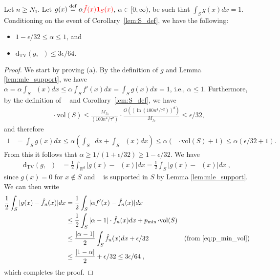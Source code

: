 \documentclass[final,12pt]{colt2018}
\newcommand{\nnew}[1]{{\color{red} #1}}
\newcommand{\nnew}[1]{#1}
\newcommand{\new}[1]{{\color{red} #1}}
\newcommand{\new}[1]{{#1}}
\newtheorem{informal theorem}[theorem]{Theorem (informal statement)}
\newcommand{\eqdef}{\stackrel{{\mathrm {\footnotesize def}}}{=}}
\newcommand{\eps}{\epsilon}
\newcommand{\TV}{\mathrm{d_{TV}}}
\newcommand{\mle}{\mathop{\hat{f}_n}}
\newcommand{\pmin}{\mathop{p_{\mathrm{min}}}}
\newcommand{\vol}{\mathrm{vol}}
\begin{document}
\begin{lemma}\label{lem:tv}
Let $n \geq N_1$.
Let $g(x) \eqdef \alpha \nnew{\tilde{f}(x) \mathbf{1}_S(x)}$, $\alpha \in [0,\infty)$, be such that $\int_{S} g(x) dx = 1$.
Conditioning on the event of Corollary~\ref{lem:S_def}, we have the following:
\begin{itemize}
\item[(a)] $1-\eps/32 \leq \alpha \leq 1$, and 
\item[(b)] $\TV(g, \mle) \leq {3\eps/64}$.
\end{itemize}
\end{lemma}
\begin{proof}
We start by proving (a).
By the definition of $g$ and Lemma \ref{lem:mle_support}, we have $\alpha = \alpha \int_{S} \mle(x) dx \leq \alpha \int_S f'(x) dx = \int_S g(x) dx = 1$, i.e., 
$\alpha \leq 1$.
Furthermore, \new{by the definition of $\pmin$ and Corollary~\ref{lem:S_def},} we have
\begin{align}
\pmin \cdot \vol(S) 
\leq \frac{M_{f_0}}{(100 n^4/\tau^2)} \cdot \frac{O((\ln(100 n^4/\tau^2))^d)}{M_{f_0}}
\leq {\eps/32}, \label{eq:p_min_vol}
\end{align}
and therefore
\begin{align*}
1 &= \int_S {g(x)} dx 
\leq \alpha \left( \int_S \pmin dx + \int_S \mle(x) dx \right) 
\leq \alpha ( \pmin \cdot \vol(S) + 1) 
\leq  {\alpha(\eps/32 + 1)}.
\end{align*}
From this it follows that
 {$\alpha \geq 1/(1+\eps/32) \geq 1 - \eps/32$}.
We have
\begin{align}
\TV(g, \mle) &= \frac{1}{2} \int_{\mathbb{R}^d} |g(x) - \mle(x)| dx = \frac{1}{2} \int_{S} |g(x) - \mle(x)| dx \;, \label{eq:tv1}
\end{align}
since \nnew{$g(x) = 0$ for $x \notin S$} and $\mle$ is supported in $S$ by Lemma \ref{lem:mle_support}.
We can then write
\begin{align*}
\frac{1}{2} \int_{S} |g(x) - \mle(x)| dx 
&= \frac{1}{2} \int_{S} |\alpha f'(x) - \mle(x)| dx \\
&\leq \frac{1}{2} \int_{S} |\alpha - 1| \cdot \mle(x) dx + \pmin \cdot \vol(S) \\
&\leq \frac{|\alpha - 1|}{2} \int_{S} \mle(x) dx +  {\eps/32} & \text{(from \eqref{eq:p_min_vol})} \\
&\leq \frac{|1 - \alpha|}{2} +  {\eps/32} \leq  {3\eps/64} \;,
\end{align*}
which completes the proof.
\end{proof}
\end{document}
